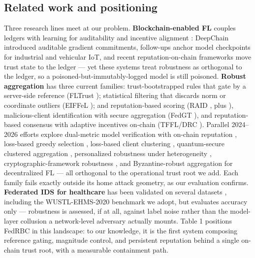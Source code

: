\documentclass[cmc,article,submit,moreauthors,pdftex]{Definitions/tsp}
\begin{document}
\subsection{Related work and positioning}\label{sec:related-work-and-positioning}

Three research lines meet at our problem. \textbf{Blockchain-enabled FL} couples ledgers with learning for auditability and incentive alignment \cite{ref-24,ref-25,ref-26,ref-27,ref-28,ref-29,ref-30,ref-31,ref-32,ref-33,ref-34}: DeepChain \cite{ref-24} introduced auditable gradient commitments, follow-ups anchor model checkpoints for industrial and vehicular IoT, and recent reputation-on-chain frameworks \cite{ref-35,ref-36} move trust state to the ledger --- yet these systems treat robustness as orthogonal to the ledger, so a poisoned-but-immutably-logged model is still poisoned. \textbf{Robust aggregation} has three current families: trust-bootstrapped rules that gate by a server-side reference (FLTrust \cite{ref-37}); statistical filtering that discards norm or coordinate outliers (EIFFeL \cite{ref-22}); and reputation-based scoring (RAID \cite{ref-23}, plus \cite{ref-38,ref-39,ref-40}), malicious-client identification with secure aggregation (FedGT \cite{ref-41}), and reputation-based consensus with adaptive incentives on-chain (TFFL/DRC \cite{ref-42}). Parallel 2024--2026 efforts explore dual-metric model verification with on-chain reputation \cite{ref-43}, loss-based greedy selection \cite{ref-44}, loss-based client clustering \cite{ref-45}, quantum-secure clustered aggregation \cite{ref-46}, personalized robustness under heterogeneity \cite{ref-47}, cryptographic-framework robustness \cite{ref-48,ref-49}, and Byzantine-robust aggregation for decentralized FL \cite{ref-50} --- all orthogonal to the operational trust root we add. Each family fails exactly outside its home attack geometry, as our evaluation confirms. \textbf{Federated IDS for healthcare} has been validated on several datasets \cite{ref-2,ref-4,ref-5,ref-6,ref-7,ref-8,ref-9,ref-10,ref-11,ref-12}, including the WUSTL-EHMS-2020 benchmark we adopt, but evaluates accuracy only --- robustness is assessed, if at all, against label noise rather than the model-layer collusion a network-level adversary actually mounts. Table 1 positions FedRBC in this landscape: to our knowledge, it is the first system composing reference gating, magnitude control, and persistent reputation behind a single on-chain trust root, with a measurable containment path.
\end{document}
